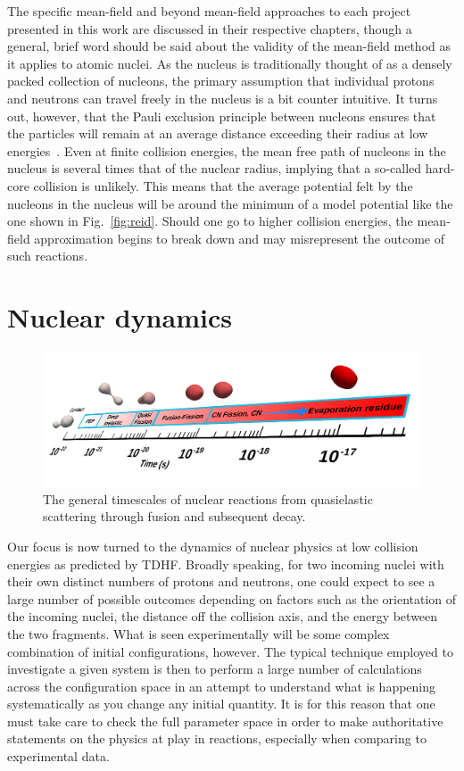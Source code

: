 The specific mean-field and beyond mean-field approaches to each project presented in this work are discussed in their respective chapters, though a general, brief word should be said about the validity of the mean-field method as it applies to atomic nuclei.
As the nucleus is traditionally thought of as a densely packed collection of nucleons, the primary assumption that individual protons and neutrons can travel freely in the nucleus is a bit counter intuitive.
It turns out, however, that the Pauli exclusion principle between nucleons ensures that the particles will remain at an average distance exceeding their radius at low energies~\citep{ring1980}.
Even at finite collision energies, the mean free path of nucleons in the nucleus is several times that of the nuclear radius, implying that a so-called hard-core collision is unlikely.
This means that the average potential felt by the nucleons in the nucleus will be around the minimum of a model potential like the one shown in Fig.~\ref{fig:reid}.
Should one go to higher collision energies, the mean-field approximation begins to break down and may misrepresent the outcome of such reactions.

\section{Nuclear dynamics}

\begin{figure}[t]
	\includegraphics[width=\textwidth]{../Figures/intro_figs/timescale.png}
	\caption{The general timescales of nuclear reactions from quasielastic scattering through fusion and subsequent decay.}
	\label{fig:timescale}
\end{figure}

Our focus is now turned to the dynamics of nuclear physics at low collision energies as predicted by TDHF.
Broadly speaking, for two incoming nuclei with their own distinct numbers of protons and neutrons, one could expect to see a large number of possible outcomes depending on factors such as the orientation of the incoming nuclei, the distance off the collision axis, and the energy between the two fragments.
What is seen experimentally will be some complex combination of initial configurations, however.
The typical technique employed to investigate a given system is then to perform a large number of calculations across the configuration space in an attempt to understand what is happening systematically as you change any initial quantity.
It is for this reason that one must take care to check the full parameter space in order to make authoritative statements on the physics at play in reactions, especially when comparing to experimental data.

